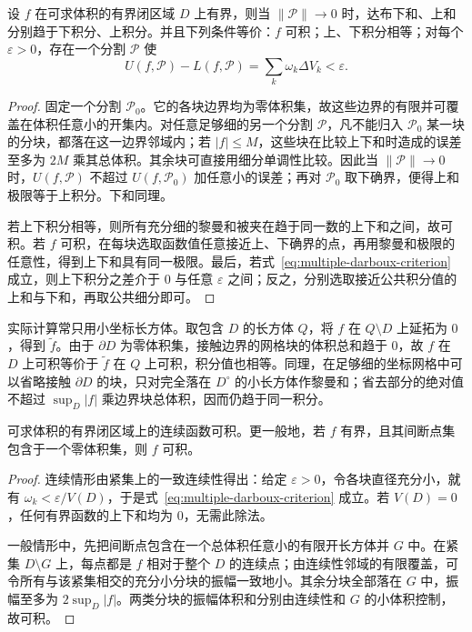 \documentclass[UTF8,12pt,a4paper,fontset=fandol]{ctexbook}
\begin{document}
\begin{theorem}
\label{thm:multiple-darboux-criterion}
设 $f$ 在可求体积的有界闭区域 $D$ 上有界，则当 $\|\mathcal P\|\to0$ 时，达布下和、上和分别趋于下积分、上积分。并且下列条件等价：$f$ 可积；上、下积分相等；对每个 $\varepsilon>0$，存在一个分割 $\mathcal P$ 使
\begin{equation}
    U(f,\mathcal P)-L(f,\mathcal P)
    =\sum_k\omega_k\Delta V_k<\varepsilon.
    \label{eq:multiple-darboux-criterion}
\end{equation}
\end{theorem}
\begin{proof}
固定一个分割 $\mathcal P_0$。它的各块边界均为零体积集，故这些边界的有限并可覆盖在体积任意小的开集内。对任意足够细的另一个分割 $\mathcal P$，凡不能归入 $\mathcal P_0$ 某一块的分块，都落在这一边界邻域内；若 $|f|\leq M$，这些块在比较上下和时造成的误差至多为 $2M$ 乘其总体积。其余块可直接用细分单调性比较。因此当 $\|\mathcal P\|\to0$ 时，$U(f,\mathcal P)$ 不超过 $U(f,\mathcal P_0)$ 加任意小的误差；再对 $\mathcal P_0$ 取下确界，便得上和极限等于上积分。下和同理。

若上下积分相等，则所有充分细的黎曼和被夹在趋于同一数的上下和之间，故可积。若 $f$ 可积，在每块选取函数值任意接近上、下确界的点，再用黎曼和极限的任意性，得到上下和具有同一极限。最后，若式~\eqref{eq:multiple-darboux-criterion} 成立，则上下积分之差介于 $0$ 与任意 $\varepsilon$ 之间；反之，分别选取接近公共积分值的上和与下和，再取公共细分即可。
\end{proof}

实际计算常只用小坐标长方体。取包含 $D$ 的长方体 $Q$，将 $f$ 在 $Q\setminus D$ 上延拓为 $0$，得到 $\widetilde f$。由于 $\partial D$ 为零体积集，接触边界的网格块的体积总和趋于 $0$，故 $f$ 在 $D$ 上可积等价于 $\widetilde f$ 在 $Q$ 上可积，积分值也相等。同理，在足够细的坐标网格中可以省略接触 $\partial D$ 的块，只对完全落在 $D^\circ$ 的小长方体作黎曼和；省去部分的绝对值不超过 $\sup_D|f|$ 乘边界块总体积，因而仍趋于同一积分。

\begin{theorem}
\label{thm:multiple-continuous-integrable}
可求体积的有界闭区域上的连续函数可积。更一般地，若 $f$ 有界，且其间断点集包含于一个零体积集，则 $f$ 可积。
\end{theorem}
\begin{proof}
连续情形由紧集上的一致连续性得出：给定 $\varepsilon>0$，令各块直径充分小，就有 $\omega_k<\varepsilon/V(D)$，于是式~\eqref{eq:multiple-darboux-criterion} 成立。若 $V(D)=0$，任何有界函数的上下和均为 $0$，无需此除法。

一般情形中，先把间断点包含在一个总体积任意小的有限开长方体并 $G$ 中。在紧集 $D\setminus G$ 上，每点都是 $f$ 相对于整个 $D$ 的连续点；由连续性邻域的有限覆盖，可令所有与该紧集相交的充分小分块的振幅一致地小。其余分块全部落在 $G$ 中，振幅至多为 $2\sup_D|f|$。两类分块的振幅体积和分别由连续性和 $G$ 的小体积控制，故可积。
\end{proof}
\end{document}
